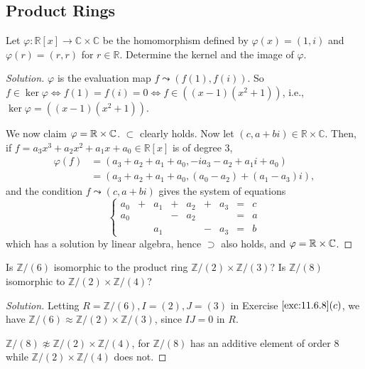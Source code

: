 \documentclass[12pt]{article}
\theoremstyle{remark}
\let\Im\relax
\DeclareMathOperator{\Im}{im}
\begin{document}
\subsection{Product Rings}
\begin{problem}
  Let $\varphi\colon \mathbb{R}[x] \to \mathbb{C} \times \mathbb{C}$ be the homomorphism defined by $\varphi(x) = (1,i)$ and $\varphi(r) = (r,r)$ for $r \in \mathbb{R}$. Determine the kernel and the image of $\varphi$.
\end{problem}
\begin{proof}[Solution]
  $\varphi$ is the evaluation map $f \leadsto (f(1),f(i))$. So $f \in \ker\varphi \iff f(1) = f(i) = 0 \iff f \in ((x-1)(x^2+1))$, i.e., $\ker\varphi = ((x-1)(x^2+1))$.
  \par We now claim $\Im\varphi = \mathbb{R} \times \mathbb{C}$. $\subset$ clearly holds. Now let $(c,a+bi) \in \mathbb{R} \times \mathbb{C}$. Then, if $f = a_3x^3 + a_2x^2 + a_1x + a_0 \in \mathbb{R}[x]$ is of degree $3$,
  \begin{align*}
    \varphi(f) &= (a_3 + a_2 + a_1 + a_0,-ia_3-a_2+a_1i+a_0)\\
    &= (a_3+a_2+a_1+a_0,(a_0-a_2)+(a_1-a_3)i),
  \end{align*}
  and the condition $f \leadsto (c,a+bi)$ gives the system of equations
  \begin{equation*}
    \left\{\begin{alignedat}{5}
      a_0 &+{}& a_1 &+{}& a_2 &+{}& a_3 &={}& c\\
      a_0 &   &     &-{}& a_2 &   &     &={}& a\\
          &   & a_1 &   &     &-{}& a_3 &={}& b
    \end{alignedat}\right.
  \end{equation*}
  which has a solution by linear algebra, hence $\supset$ also holds, and $\Im\varphi = \mathbb{R} \times \mathbb{C}$.
\end{proof}

\begin{problem}
  Is $\mathbb{Z}/(6)$ isomorphic to the product ring $\mathbb{Z}/(2) \times \mathbb{Z}/(3)$? Is $\mathbb{Z}/(8)$ isomorphic to $\mathbb{Z}/(2) \times \mathbb{Z}/(4)$?
\end{problem}
\begin{proof}[Solution]
  Letting $R = \mathbb{Z}/(6), I = (2), J = (3)$ in Exercise $\ref{exc:11.6.8}(c)$, we have $\mathbb{Z}/(6) \approx \mathbb{Z}/(2) \times \mathbb{Z}/(3)$, since $IJ = 0$ in $R$.
  \par $\mathbb{Z}/(8) \not\approx \mathbb{Z}/(2) \times \mathbb{Z}/(4)$, for $\mathbb{Z}/(8)$ has an additive element of order $8$ while $\mathbb{Z}/(2) \times \mathbb{Z}/(4)$ does not.
\end{proof}
\end{document}
